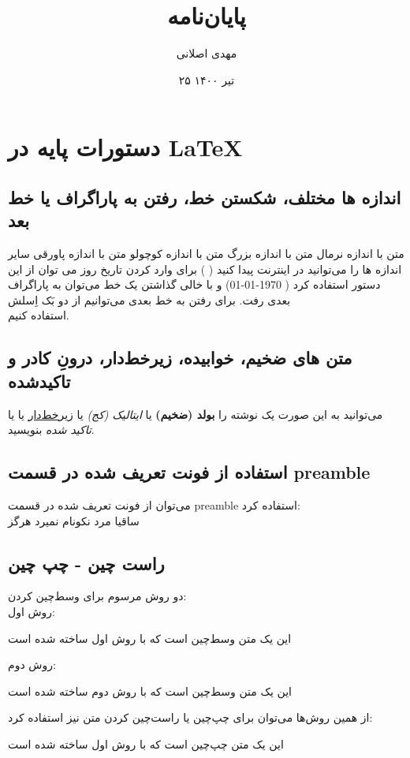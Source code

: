 \documentclass[12pt]{book}
\title{پایان‌نامه}
\author{مهدی اصلانی}
\date{۲۵ تیر ۱۴۰۰}
\begin{document}
\maketitle

\chapter{دستورات پایه در \LaTeX}
\section{اندازه ها مختلف، شکستن خط، رفتن به پاراگراف یا خط بعد }


متن با اندازه نرمال
{\LARGE متن با اندازه بزرگ}
{\tiny  متن با اندازه کوچولو}
 {\footnotesize متن با اندازه پاورقی}
سایر اندازه ها را می‌توانید در اینترنت پیدا کنید (
)
  برای وارد کردن تاریخ روز می توان از این دستور استفاده کرد
( \today )
و با خالی گذاشتن یک خط می‌توان به پاراگراف بعدی رفت. برای رفتن به خط بعدی می‌توانیم از دو بَک اِسلش \\ استفاده کنیم.


\section{متن های ضخیم، خوابیده، زیرخط‌دار، درونِ کادر و تاکید‌شده}
می‌توانید به این صورت  یک نوشته را 
\textbf{بولد (ضخیم)}
یا
\textit{ایتالیک (کج)}
یا
\underline{زیرخط‌دار}
یا
یا
\emph{تاکید شده}
بنویسید.


\section{استفاده از فونت تعریف شده در قسمت preamble}
می‌توان از فونت تعریف شده در قسمت preamble استفاده کرد:\\
{\nast ساقیا مرد نکونام نمیرد هرگز}\\

\newpage

\section{راست چین - چپ چین}
دو روش مرسوم برای وسط‌چین کردن:\\
روش اول:\\
\begin{center}
	این یک متن وسط‌چین است که با روش اول ساخته شده‌ است
\end{center}
روش دوم:\\
\centerline{	این یک متن وسط‌چین است که با روش دوم ساخته شده‌ است}
از همین روش‌ها می‌توان برای چپ‌چین یا راست‌چین کردن متن نیز استفاده کرد:\\
\begin{flushleft}
		این یک متن چپ‌چین است که با روش اول ساخته شده‌ است
\end{flushleft}
\end{document}

